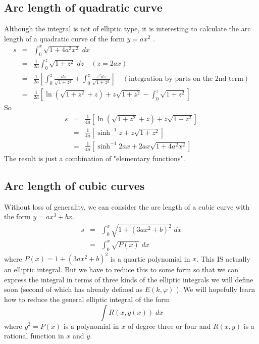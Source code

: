 \documentclass{article}
\begin{document}
\subsection{Arc length of quadratic curve}
\label{sec-2-3}
Although the integral is not of elliptic type, it is interesting to calculate the arc length of a quadratic curve of the form $y=a x^{2}$ .
\begin{eqnarray}
s &=&  \int_{0}^{x} \sqrt{ 1  + 4 a^{2} x^{2} } \; dx \\ \nonumber
  &=& \frac{1}{2a} \int_{0}^{z} \sqrt{ 1  +   z^{2}} \; dz \quad (z = 2ax) \\ \nonumber
  &=& \frac{1}{2a} \left[ \int_{0}^{z} \frac{dz}{\sqrt{1 + z^{2}}} + \int_{0}^{z} \frac{z^{2}dz}{\sqrt{1 + z^{2}}} \right]  \quad (\text{integration by parts on the 2nd term}) \\ \nonumber
  &=& \frac{1}{2a} \left[ \ln{\left( \sqrt{1 + z^{2}} + z \right)} + z\sqrt{1 + z^{2}} - \int_{0}^{z} \sqrt{1 + z^{2}} \right]
\end{eqnarray}
So
\begin{eqnarray}
s &=& \frac{1}{4a} \left[ \ln{\left( \sqrt{1 + z^{2}} + z \right)} + z\sqrt{1 + z^{2}} \right] \\ \nonumber
  &=& \frac{1}{4a} \left[ \sinh^{-1}{z} + z\sqrt{1 + z^{2}} \right] \\ \nonumber
  &=& \frac{1}{4a} \left[ \sinh^{-1}{2ax} + 2ax\sqrt{1 + 4a^{2}x^{2}} \right] 
\end{eqnarray}
The result is just a combination of "elementary functions".
\subsection{Arc length of cubic curves}
\label{sec-2-4}
Without loss of generality, we can consider the arc length of a cubic curve with the form $y = ax^{3} + bx$.
\begin{eqnarray}
s &=&  \int_{0}^{x} \sqrt{ 1  + ( 3a x^{2} + b)^{2}} \; dx \\ \nonumber
  &=& \int_{0}^{x} \sqrt{P(x)} \; dx
\end{eqnarray}
where $P(x) = 1 + (3ax^{2} +b)^{2}$ is a quartic polynomial in $x$. This IS actually an elliptic integral. 
But we have to reduce this to some form so that we can express the integral in terms of three kinds of the elliptic integrals we will define soon (second of which has already defined as $E(k,\varphi)$ ).
We will hopefully learn how to reduce the general elliptic integral of the form
\begin{equation}
\int R(x, y(x)) \; dx
\end{equation}
where $y^{2} = P(x)$ is a polynomial in $x$ of degree three or four and $R(x,y)$ is a rational function in $x$ and $y$.
\end{document}
